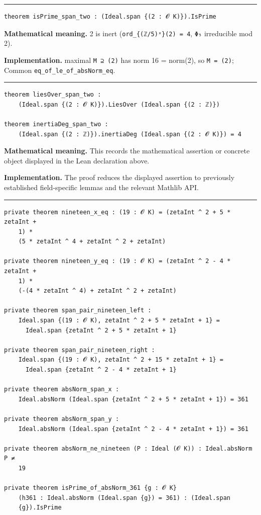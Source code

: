 \documentclass[UTF8,a4paper,11pt,fontset=fandol]{ctexart}
\theoremstyle{definition}
\newcommand{\statementsep}{\par\medskip\hrule\medskip}
\begin{document}
\statementsep
\begin{verbatim}
theorem isPrime_span_two : (Ideal.span {(2 : 𝓞 K)}).IsPrime
\end{verbatim}
\noindent\textbf{Mathematical meaning.} 2 is inert (\texttt{ord\_\allowbreak{}\{(ℤ/\allowbreak{}5)ˣ\}(2) = 4}, \texttt{Φ₅} irreducible mod 2).\par
\noindent\textbf{Implementation.} maximal \texttt{M ⊇ (2)} has norm 16 = norm(2), so \texttt{M = (2)}; Common \texttt{eq\_\allowbreak{}of\_\allowbreak{}le\_\allowbreak{}of\_\allowbreak{}absNorm\_\allowbreak{}eq}.\par
\statementsep
\begin{verbatim}
theorem liesOver_span_two :
    (Ideal.span {(2 : 𝓞 K)}).LiesOver (Ideal.span {(2 : ℤ)})

theorem inertiaDeg_span_two :
    (Ideal.span {(2 : ℤ)}).inertiaDeg (Ideal.span {(2 : 𝓞 K)}) = 4
\end{verbatim}
\noindent\textbf{Mathematical meaning.} This records the mathematical assertion or concrete object displayed in the Lean declaration above.\par
\noindent\textbf{Implementation.} The proof reduces the displayed assertion to previously established field-specific lemmas and the relevant Mathlib API.\par
\statementsep
\begin{verbatim}
private theorem nineteen_x_eq : (19 : 𝓞 K) = (zetaInt ^ 2 + 5 * zetaInt +
    1) *
    (5 * zetaInt ^ 4 + zetaInt ^ 2 + zetaInt)

private theorem nineteen_y_eq : (19 : 𝓞 K) = (zetaInt ^ 2 - 4 * zetaInt +
    1) *
    (-(4 * zetaInt ^ 4) + zetaInt ^ 2 + zetaInt)

private theorem span_pair_nineteen_left :
    Ideal.span {(19 : 𝓞 K), zetaInt ^ 2 + 5 * zetaInt + 1} =
      Ideal.span {zetaInt ^ 2 + 5 * zetaInt + 1}

private theorem span_pair_nineteen_right :
    Ideal.span {(19 : 𝓞 K), zetaInt ^ 2 + 15 * zetaInt + 1} =
      Ideal.span {zetaInt ^ 2 - 4 * zetaInt + 1}

private theorem absNorm_span_x :
    Ideal.absNorm (Ideal.span {zetaInt ^ 2 + 5 * zetaInt + 1}) = 361

private theorem absNorm_span_y :
    Ideal.absNorm (Ideal.span {zetaInt ^ 2 - 4 * zetaInt + 1}) = 361

private theorem absNorm_ne_nineteen (P : Ideal (𝓞 K)) : Ideal.absNorm P ≠
    19

private theorem isPrime_of_absNorm_361 {g : 𝓞 K}
    (h361 : Ideal.absNorm (Ideal.span {g}) = 361) : (Ideal.span
    {g}).IsPrime
\end{verbatim}
\end{document}
